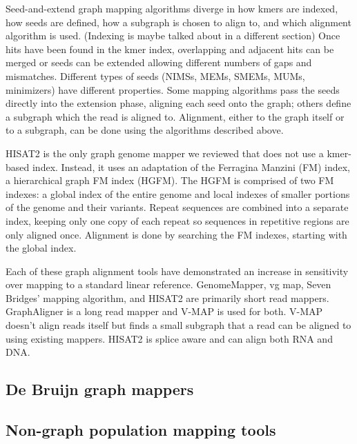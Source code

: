 Seed-and-extend graph mapping algorithms diverge in how kmers are indexed, how seeds are defined, how a subgraph is chosen to align to, and which alignment algorithm is used.
(Indexing is maybe talked about in a different section)
Once hits have been found in the kmer index, overlapping and adjacent hits can be merged or seeds can be extended allowing different numbers of gaps and mismatches.
Different types of seeds (NIMSs, MEMs, SMEMs, MUMs, minimizers) have different properties.
Some mapping algorithms pass the seeds directly into the extension phase, aligning each seed onto the graph; others define a subgraph which the read is aligned to.
Alignment, either to the graph itself or to a subgraph, can be done using the algorithms described above.

HISAT2 is the only graph genome mapper we reviewed that does not use a kmer-based index.
Instead, it uses an adaptation of the Ferragina Manzini (FM) index, a hierarchical graph FM index (HGFM).
The HGFM is comprised of two FM indexes: a global index of the entire genome and local indexes of smaller portions of the genome and their variants.
Repeat sequences are combined into a separate index, keeping only one copy of each repeat so sequences in repetitive regions are only aligned once.
Alignment is done by searching the FM indexes, starting with the global index.


Each of these graph alignment tools have demonstrated an increase in sensitivity over mapping to a standard linear reference.
GenomeMapper, vg map, Seven Bridges' mapping algorithm, and HISAT2 are primarily short read mappers.
GraphAligner is a long read mapper and V-MAP is used for both.
V-MAP doesn't align reads itself but finds a small subgraph that a read can be aligned to using existing mappers. 
HISAT2 is splice aware and can align both RNA and DNA.


\subsection{De Bruijn graph mappers}

\subsection{Non-graph population mapping tools}

